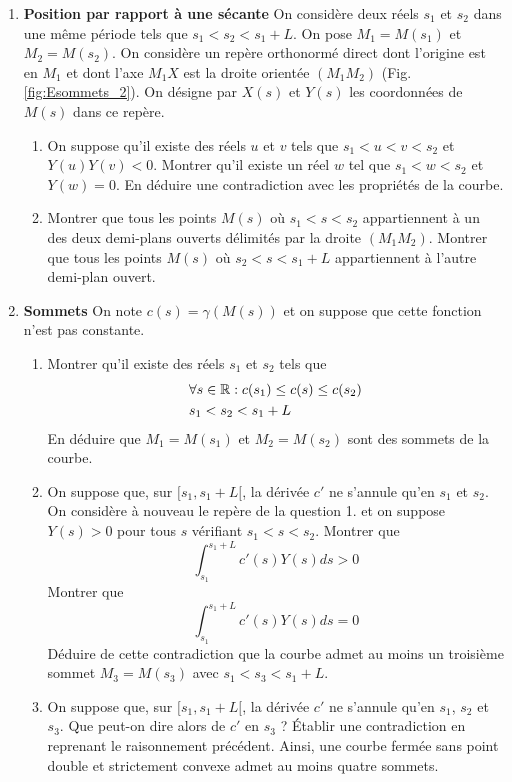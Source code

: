 \begin{enumerate}
 \item \textbf{Position par rapport à une sécante}\newline
On considère deux réels $s_1$ et $s_2$ dans une même période tels que $s_1<s_2<s_1+L$. On pose $M_1=M(s_1)$ et $M_2=M(s_2)$. On considère un repère orthonormé direct dont l'origine est en $M_1$ et dont l'axe $M_1X$ est la droite orientée $(M_1M_2)$ (Fig.\ref{fig:Esommets_2}). On désigne par $X(s)$ et $Y(s)$ les coordonnées de $M(s)$ dans ce repère.
\begin{enumerate}
 \item On suppose qu'il existe des réels $u$ et $v$ tels que $s_1 < u < v < s_2$ et $Y(u)Y(v)<0$.\newline
Montrer qu'il existe un réel $w$ tel que $s_1 < w < s_2$ et $Y(w)=0$.\newline
En déduire une contradiction avec les propriétés de la courbe.
 \item Montrer que tous les points $M(s)$ où $s_1<s<s_2$ appartiennent à un des deux demi-plans ouverts délimités par la droite $(M_1M_2)$. Montrer que tous les points $M(s)$ où $s_2<s<s_1+L$ appartiennent à l'autre demi-plan ouvert.
\end{enumerate}

\item \textbf{Sommets}\newline
On note $c(s)=\gamma(M(s))$ et on suppose que cette fonction n'est pas constante.
\begin{enumerate}
 \item Montrer qu'il existe des réels $s_1$ et $s_2$ tels que
\begin{align*}
 &\forall s\in \mathbb{R} : c(s_1)\leq c(s)\leq c(s_2) \\
 & s_1 < s_2 <s_1 + L
\end{align*}
En déduire que $M_1=M(s_1)$ et $M_2=M(s_2)$ sont des sommets de la courbe.
\item On suppose que, sur $[s_1,s_1+L[$, la dérivée $c'$ ne s'annule qu'en $s_1$ et $s_2$.\newline
On considère à nouveau le repère de la question 1. et on suppose $Y(s)>0$ pour tous $s$ vérifiant $s_1<s<s_2$.\newline
Montrer que
\begin{displaymath}
 \int_{s_1}^{s_1+L}c'(s)Y(s)ds >0
\end{displaymath}
Montrer que
\begin{displaymath}
 \int_{s_1}^{s_1+L}c'(s)Y(s)ds =0
\end{displaymath}
Déduire de cette contradiction que la courbe admet au moins un troisième sommet $M_3=M(s_3)$ avec $s_1<s_3<s_1+L$.

\item  On suppose que, sur $[s_1,s_1+L[$, la dérivée $c'$ ne s'annule qu'en $s_1$, $s_2$ et $s_3$. Que peut-on dire alors de $c'$ en $s_3$ ? \'Etablir une contradiction en reprenant le raisonnement précédent.\newline
Ainsi, une courbe fermée sans point double et strictement convexe admet au moins quatre sommets.
\end{enumerate}

\end{enumerate}
